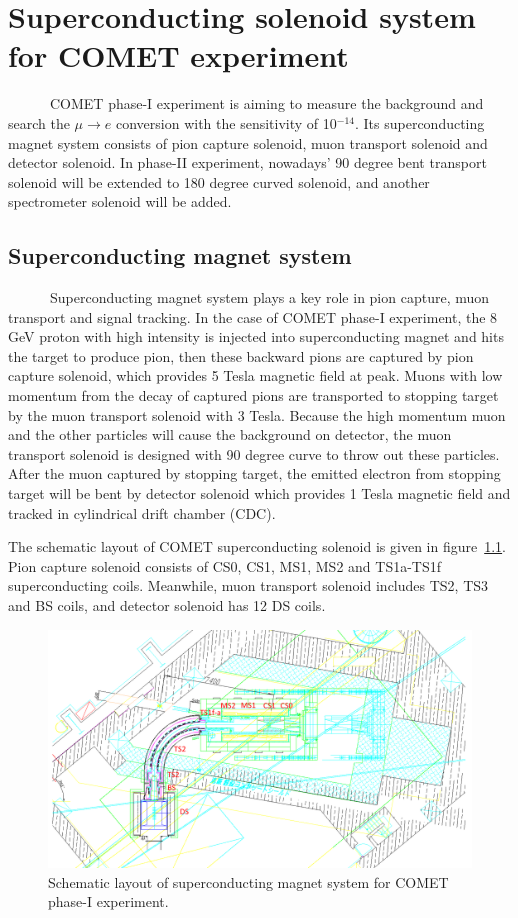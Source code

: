\chapter{Superconducting solenoid system for COMET experiment}
~~~~~~COMET phase-I experiment is aiming to measure the background and search the $\mu \rightarrow e$ conversion with the sensitivity of 10$^{-14}$.
Its superconducting magnet system consists of pion capture solenoid, muon transport solenoid and detector solenoid.
In phase-II experiment, nowadays' 90 degree bent transport solenoid will be extended to 180 degree curved solenoid, and another spectrometer solenoid will be added.
 
\section{Superconducting magnet system}
~~~~~~Superconducting magnet system plays a key role in pion capture, muon transport and signal tracking.
In the case of COMET phase-I experiment, the 8 GeV proton with high intensity is injected into superconducting magnet and hits the target to produce pion, then these backward pions are captured by pion capture solenoid, which provides 5 Tesla magnetic field at peak.
Muons with low momentum from the decay of captured pions are transported to stopping target by the muon transport solenoid with 3 Tesla.
Because the high momentum muon and the other particles will cause the background on detector, the muon transport solenoid is designed with 90 degree curve to throw out these particles.
After the muon captured by stopping target, the emitted electron from stopping target will be bent by detector solenoid which provides 1 Tesla magnetic field and tracked in cylindrical drift chamber (CDC).

The schematic layout of COMET superconducting solenoid is given in figure~\ref{solenoid}.
Pion capture solenoid consists of CS0, CS1, MS1, MS2 and TS1a-TS1f superconducting coils.
Meanwhile, muon transport solenoid includes TS2, TS3 and BS coils, and detector solenoid has 12 DS coils.
\begin{figure}[H]
 \centering
 \includegraphics[scale=0.45]{chapter2/fig/solenoid.pdf}
 \caption{Schematic layout of superconducting magnet system for COMET phase-I experiment.}
 \label{solenoid}
\end{figure}


